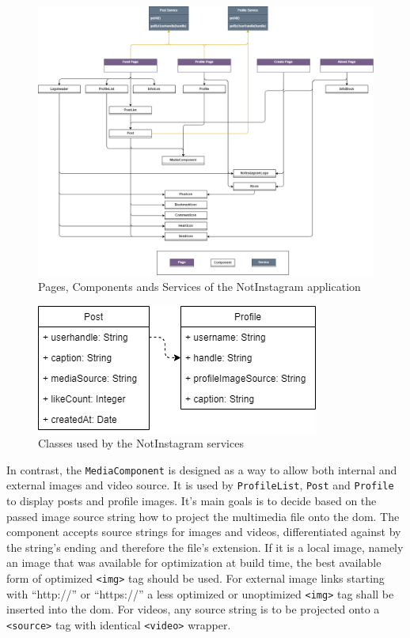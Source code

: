 \documentclass[a4paper, 12pt]{article}
\begin{document}
\begin{figure}
  \includegraphics[width=\linewidth]{diagrams/uml.png}
  \caption{Pages, Components ands Services of the NotInstagram application}\label{fig:uml}
\end{figure}
\begin{figure}
  \begin{center}
    \includegraphics[width=0.5\linewidth]{diagrams/entities.png}
  \end{center}
  \caption{Classes used by the NotInstagram services}\label{fig:classes}
\end{figure}

In contrast, the \verb|MediaComponent| is designed as a way to allow both internal and external images and video source.
It is used by \verb|ProfileList|, \verb|Post| and \verb|Profile| to display posts and profile images.
It's main goals is to decide based on the passed image source string how to project the multimedia file onto the \acrshort{dom}.
The component accepts source strings for images and videos, differentiated against by the string's ending and therefore the file's extension.
If it is a local image, namely an image that was available for optimization at build time, the best available form of optimized \verb|<img>| tag should be used.
For external image links starting with \enquote{http://} or \enquote{https://} a less optimized or unoptimized \verb|<img>| tag shall be inserted into the \acrshort{dom}.
For videos, any source string is to be projected onto a \verb|<source>| tag with identical \verb|<video>| wrapper.
\end{document}
